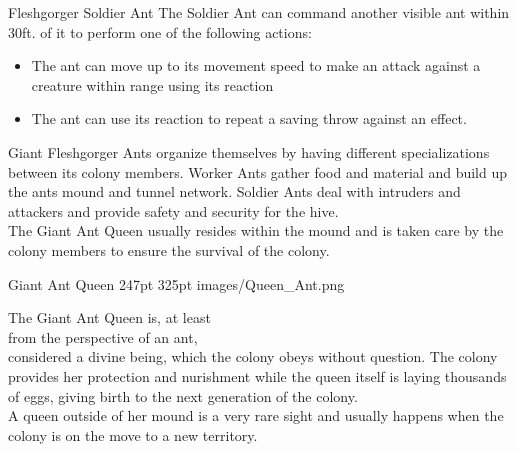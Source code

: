 \documentclass[letterpaper,openany,twoside,twocolumn]{book}
\begin{document}
\begin{DndMonster}[width=0.5\textwidth]{Fleshgorger Soldier Ant}
    The Soldier Ant can command another visible ant within 30ft. of it to perform one of the following actions:
    \begin{itemize}
    		\item The ant can move up to its movement speed to make an attack against a creature within range using its reaction
    		\item The ant can use its reaction to repeat a saving throw against an effect.
    \end{itemize}
      
\end{DndMonster}

\noindent Giant Fleshgorger Ants organize themselves by having different specializations between its colony members. Worker Ants gather food and material and build up the ants mound and tunnel network. Soldier Ants deal with intruders and attackers and provide safety and security for the hive.\\
The Giant Ant Queen usually resides within the mound and is taken care by the colony members to ensure the survival of the colony.


\MonsterBannerGraphic%
	{Giant Ant Queen}%
	{247pt}%
	{325pt}%
	{images/Queen_Ant.png}%
	{}%
	
\noindent The Giant Ant Queen is, at least\\
from the perspective of an ant,\\
considered a divine being, which the colony obeys without question. The colony provides her protection and nurishment while the queen itself is laying thousands of eggs, giving birth to the next generation of the colony.\\
A queen outside of her mound is a very rare sight and usually happens when the colony is on the move to a new territory.
\end{document}
